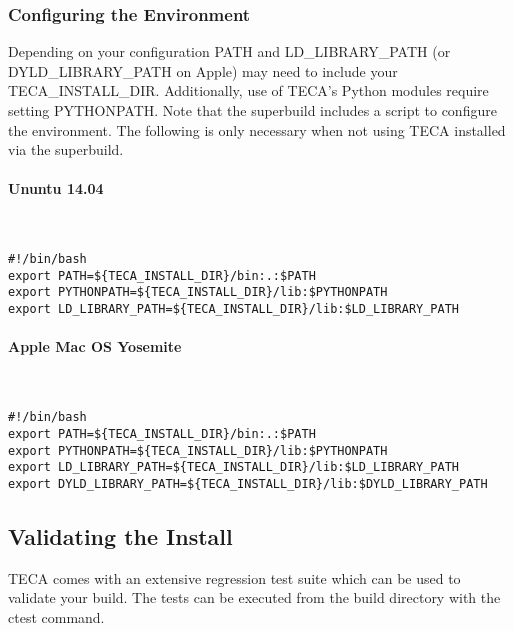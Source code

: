 \documentclass[a4paper,10pt,DIV=12]{scrreprt}
\begin{document}
\subsubsection{Configuring the Environment}
Depending on your configuration PATH and LD\_LIBRARY\_PATH (or DYLD\_LIBRARY\_PATH on Apple)
may need to include your TECA\_INSTALL\_DIR. Additionally,
use of TECA's Python modules require setting PYTHONPATH. Note that the superbuild includes
a script to configure the environment. The following is only necessary when not using
TECA installed via the superbuild.

\paragraph{Ununtu 14.04} $\;$ \\ \\
\vspace{2mm}\hspace{0.2in}\begin{minipage}{0.8\textwidth}
\begin{verbatim}
#!/bin/bash
export PATH=${TECA_INSTALL_DIR}/bin:.:$PATH
export PYTHONPATH=${TECA_INSTALL_DIR}/lib:$PYTHONPATH
export LD_LIBRARY_PATH=${TECA_INSTALL_DIR}/lib:$LD_LIBRARY_PATH
\end{verbatim}
\end{minipage}\vspace{2mm}

\paragraph{Apple Mac OS Yosemite} $\;$ \\ \\
\vspace{2mm}\hspace{0.2in}\begin{minipage}{0.8\textwidth}
\begin{verbatim}
#!/bin/bash
export PATH=${TECA_INSTALL_DIR}/bin:.:$PATH
export PYTHONPATH=${TECA_INSTALL_DIR}/lib:$PYTHONPATH
export LD_LIBRARY_PATH=${TECA_INSTALL_DIR}/lib:$LD_LIBRARY_PATH
export DYLD_LIBRARY_PATH=${TECA_INSTALL_DIR}/lib:$DYLD_LIBRARY_PATH
\end{verbatim}
\end{minipage}\vspace{2mm}



\subsection{Validating the Install}
TECA comes with an extensive regression test suite which can be used to validate
your build. The tests can be executed from the build directory with the ctest command.
\end{document}
